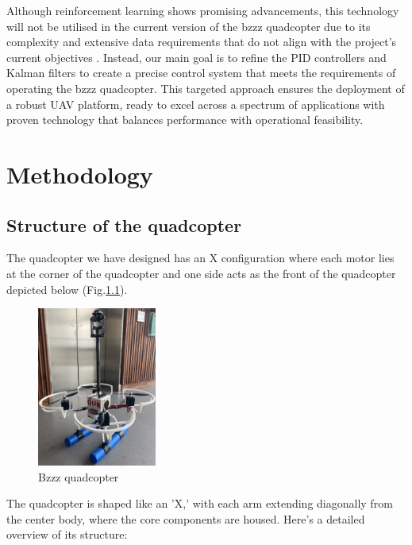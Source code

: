 \documentclass{report}
\begin{document}
Although reinforcement learning shows promising advancements, this technology
will not be utilised in the current version of the bzzz quadcopter due to its
complexity and extensive data requirements that do not align with the project's
current objectives \cite{ReinforcementLearning}. Instead, our main goal is to
refine the PID controllers and Kalman filters to create a precise control system
that meets the requirements of operating the bzzz quadcopter. This targeted
approach ensures the deployment of a robust UAV platform, ready to excel across
a spectrum of applications with proven technology that balances performance with
operational feasibility.

\chapter{Methodology}
\section{Structure of the quadcopter}
The quadcopter we have designed has an X configuration where each motor lies at
the corner of the quadcopter and one side acts as the front of the quadcopter
depicted below (Fig.\ref{fig:QuadDiagram}). 

\begin{figure}[h] %
  \centering
  \includegraphics[width=0.35\textwidth]{Pictures/Quad.jpg} 
  \caption{Bzzz quadcopter}
  \label{fig:QuadDiagram}
\end{figure}

\noindent
The quadcopter is shaped like an 'X,' with each arm extending diagonally from the
center body, where the core components are housed. Here's a detailed overview of
its structure:
\end{document}

